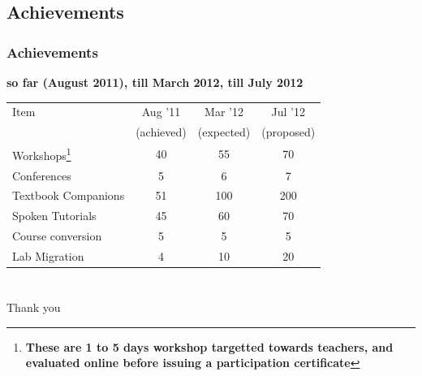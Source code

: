 \documentclass[compress,red]{beamer} %
\begin{document}
\subsection{Achievements}	
\begin{frame}
\frametitle{Achievements}
\small \bf
{\bf so far (August 2011), till March 2012, till July 2012}
\begin{center}
\begin{table}[h]
\begin{tabular}{|l|c|c|c|}
\hline 
Item & Aug '11 & Mar '12 & Jul '12 \tabularnewline
& (achieved) & (expected) & (proposed) \tabularnewline
\hline
\hline 
Workshops\footnote{\bf These are 1 to 5 days workshop targetted towards
\alert{teachers}, and \alert{evaluated online} before issuing a participation
certificate}  & 40 &  55 & 70\tabularnewline
\hline 
Conferences & 5 & 6 & 7 \tabularnewline
\hline 
Textbook Companions & 51 & 100 & 200 \tabularnewline
\hline 
Spoken Tutorials & 45 & 60 & 70 \tabularnewline
\hline 
Course conversion & 5 & 5 & 5\tabularnewline
\hline
Lab Migration & 4 & 10 & 20 \tabularnewline
\hline
\end{tabular}
\end{table}
\end{center}
\end{frame}

\section*{}
\begin{frame}
    \begin{center}
        \huge
        Thank you\\ \pause
    \end{center}
\end{frame}
\end{document}
